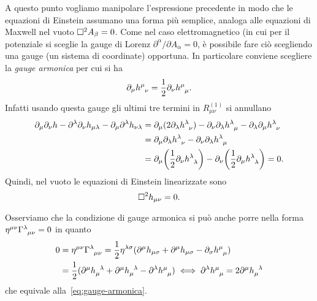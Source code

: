A questo punto vogliamo manipolare l'espressione precedente in modo che le
equazioni di Einstein assumano una forma più semplice, analoga alle equazioni di
Maxwell nel vuoto $\Box^{2} A_{\beta} = 0$.  Come nel caso elettromagnetico (in
cui per il potenziale si sceglie la gauge di Lorenz $\partial^{\alpha}/\partial
A_{\alpha}=0$, è possibile fare ciò scegliendo una gauge (un sistema di
coordinate) opportuna.  In particolare conviene scegliere la
\emph{gauge armonica} per cui si ha
\begin{equation}
  \label{eq:gauge-armonica}
  \partial_{\mu} \tensor{h}{^{\mu}_{\nu}} =
  \frac{1}{2}\partial_{\nu}\tensor{h}{^{\mu}_{\mu}}.
\end{equation}
Infatti usando questa gauge gli ultimi tre termini in $R_{\mu \nu}^{(1)}$
si annullano
\begin{equation}
  \begin{split}
    \partial_{\mu}\partial_{\nu} h - \partial^{\lambda}\partial_{\nu}
    h_{\mu\lambda} - \partial_{\mu}\partial^{\lambda} h_{\nu\lambda}
    &= \partial_{\mu}(2 \partial_{\lambda}\tensor{h}{^{\lambda}_{\nu}})
    - \partial_{\nu}\partial_{\lambda}\tensor{h}{^{\lambda}_{\mu}}
    - \partial_{\lambda}\partial_{\mu} \tensor{h}{^{\lambda}_{\nu}} \\
    &= \partial_{\mu}\partial_{\lambda} \tensor{h}{^{\lambda}_{\nu}}
    - \partial_{\nu}\partial_{\lambda} \tensor{h}{^{\lambda}_{\mu}} \\
    &= \partial_{\mu}\bigg(\frac{1}{2}\partial_{\nu}
    \tensor{h}{^{\lambda}_{\lambda}}\bigg)
    - \partial_{\nu}\bigg(\frac{1}{2}\partial_{\mu}
    \tensor{h}{^{\lambda}_{\lambda}}\bigg) = 0.
  \end{split}
\end{equation}
Quindi, nel vuoto  le equazioni di Einstein linearizzate sono
\begin{equation}
  \label{eq:einstein-lineare}
  \Box^{2} h_{\mu\nu} = 0.
\end{equation}

Osserviamo che la condizione di gauge armonica si può anche porre nella forma
$\eta^{\mu\nu}\tensor{\Gamma}{^{\lambda}_{\mu\nu}} = 0$ in quanto
\begin{equation}
  \begin{split}
    0 &=\eta^{\mu\nu} \tensor{\Gamma}{^{\lambda}_{\mu\nu}} = \frac{1}{2}
    \eta^{\lambda\sigma} (\partial^{\mu}h_{\mu\sigma} + \partial^{\mu}
    h_{\mu\sigma} - \partial_{\sigma}\tensor{h}{^{\mu}_{\mu}}) \\
    &= \frac{1}{2} (\partial^{\mu} \tensor{h}{_{\mu}^{\lambda}} + \partial^{\mu}
    \tensor{h}{_{\mu}^{\lambda}} - \partial^{\lambda} \tensor{h}{^{\mu}_{\mu}})
    \iff \partial^{\lambda} \tensor{h}{^{\mu}_{\mu}} = 2 \partial^{\mu}
    \tensor{h}{_{\mu}^{\lambda}}
  \end{split}
\end{equation}
che equivale alla~\eqref{eq:gauge-armonica}.

